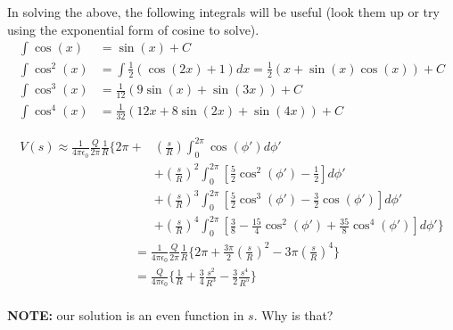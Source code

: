 \documentclass[a4paper, 11pt]{article}
\newenvironment{solution}{%
	\begin{list}{}{%
			\setlength{\topsep}{0pt}%
			\setlength{\leftmargin}{0.5cm}%
			\setlength{\rightmargin}{0.5cm}%
			\setlength{\listparindent}{\parindent}%
			\setlength{\itemindent}{\parindent}%
			\setlength{\parsep}{\parskip}%
		}%
		\item[]}{\end{list}}
\begin{document}
\begin{solution}
  \noindent In solving the above, the following integrals will be useful (look
  them up or try using the exponential form of cosine to solve).
  \begin{align}
    \int \cos(x) &= \sin(x)+C\\
    \int \cos^2(x) &= \int \frac{1}{2}(\cos(2x)+1)dx = \frac{1}{2}(x+\sin(x)\cos(x))+ C\\
    \int \cos^3(x) &= \frac{1}{12}(9\sin(x)+\sin(3x))+C\\
    \int \cos^4(x) &= \frac{1}{32}(12x+8\sin(2x)+\sin(4x)) + C
  \end{align}
  
  \begin{equation}
    \begin{split}
      V(s)\approx\frac{1}{4\pi\epsilon_0}\frac{Q}{2\pi}\frac{1}{R}\Bigg\{ 2\pi + &\left( \frac{s}{R} \right)\int_0^{2\pi}\cos(\phi')d\phi'\\
      &+ \left( \frac{s}{R} \right)^2\int_0^{2\pi}\left[ \frac{5}{2}\cos^2(\phi')-\frac{1}{2}  \right]d\phi'\\
      &+ \left( \frac{s}{R} \right)^3 \int_0^{2\pi}\left[ \frac{5}{2}\cos^3(\phi')-\frac{3}{2}\cos(\phi')    \right]d\phi'\\
      &+ \left( \frac{s}{R} \right)^4\int_0^{2\pi}\left[ \frac{3}{8}-\frac{15}{4}\cos^2(\phi')+\frac{35}{8}\cos^4(\phi') \right] d\phi' \Bigg\}
    \end{split}
  \end{equation}
  \begin{align}
    &= \frac{1}{4\pi\epsilon_0}\frac{Q}{2\pi}\frac{1}{R}\Bigg\{2\pi+ \frac{3\pi}{2}\left( \frac{s}{R} \right)^2 -3\pi\left( \frac{s}{R} \right)^4\Bigg\} \\
    &= \frac{Q}{4\pi\epsilon_0}\Bigg\{ \frac{1}{R}+\frac{3}{4} \frac{s^2}{R^3} -\frac{3}{2} \frac{s^4}{R^5}\Bigg\} \\
  \end{align}

  \textbf{NOTE:} our solution is an even function in $s$. Why is that? 

  
\end{solution}
\end{document}
